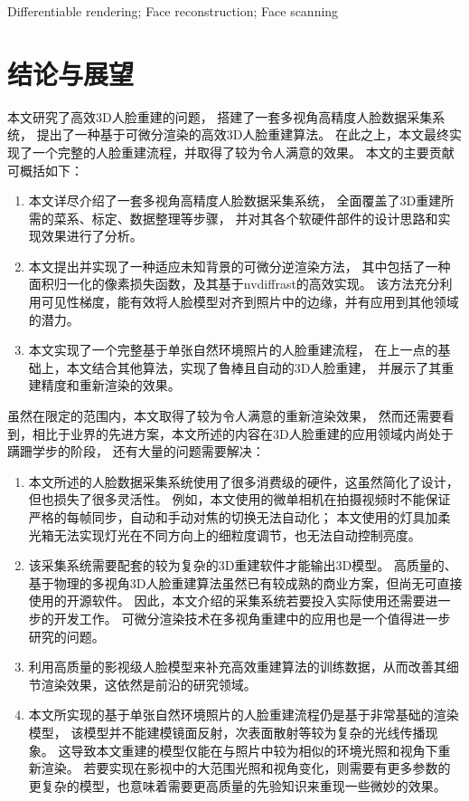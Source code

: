 \documentclass{scutmaster}
\begin{document}
 Differentiable rendering; Face reconstruction; Face scanning

\tableofcontents

\listoffigures

\listoftables

\mainmatter










\chapter{结论与展望}
\label{chap:conclusion}

本文研究了高效3D人脸重建的问题，
搭建了一套多视角高精度人脸数据采集系统，
提出了一种基于可微分渲染的高效3D人脸重建算法。
在此之上，本文最终实现了一个完整的人脸重建流程，并取得了较为令人满意的效果。
本文的主要贡献可概括如下：
\begin{enumerate}
\item 本文详尽介绍了一套多视角高精度人脸数据采集系统，
全面覆盖了3D重建所需的菜系、标定、数据整理等步骤，
并对其各个软硬件部件的设计思路和实现效果进行了分析。
\item 本文提出并实现了一种适应未知背景的可微分逆渲染方法，
其中包括了一种面积归一化的像素损失函数，及其基于nvdiffrast的高效实现。
该方法充分利用可见性梯度，能有效将人脸模型对齐到照片中的边缘，并有应用到其他领域的潜力。
\item 本文实现了一个完整基于单张自然环境照片的人脸重建流程，
在上一点的基础上，本文结合其他算法，实现了鲁棒且自动的3D人脸重建，
并展示了其重建精度和重新渲染的效果。
\end{enumerate}

虽然在限定的范围内，本文取得了较为令人满意的重新渲染效果，
然而还需要看到，相比于业界的先进方案，本文所述的内容在3D人脸重建的应用领域内尚处于蹒跚学步的阶段，
还有大量的问题需要解决：
\begin{enumerate}
\item 本文所述的人脸数据采集系统使用了很多消费级的硬件，这虽然简化了设计，但也损失了很多灵活性。
例如，本文使用的微单相机在拍摄视频时不能保证严格的每帧同步，自动和手动对焦的切换无法自动化；
本文使用的灯具加柔光箱无法实现灯光在不同方向上的细粒度调节，也无法自动控制亮度。
\item 该采集系统需要配套的较为复杂的3D重建软件才能输出3D模型。
高质量的、基于物理的多视角3D人脸重建算法虽然已有较成熟的商业方案，但尚无可直接使用的开源软件。
因此，本文介绍的采集系统若要投入实际使用还需要进一步的开发工作。
可微分渲染技术在多视角重建中的应用也是一个值得进一步研究的问题。
\item 利用高质量的影视级人脸模型来补充高效重建算法的训练数据，从而改善其细节渲染效果，这依然是前沿的研究领域。
\item 本文所实现的基于单张自然环境照片的人脸重建流程仍是基于非常基础的渲染模型，
该模型并不能建模镜面反射，次表面散射等较为复杂的光线传播现象。
这导致本文重建的模型仅能在与照片中较为相似的环境光照和视角下重新渲染。
若要实现在影视中的大范围光照和视角变化，则需要有更多参数的更复杂的模型，也意味着需要更高质量的先验知识来重现一些微妙的效果。
\end{enumerate}
\end{document}
